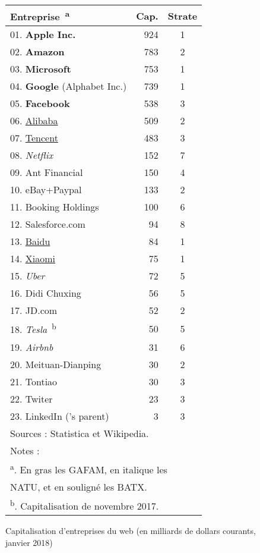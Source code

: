 \begin{figure}[t]
 \centering
 {\caption{Capitalisation d'entreprises du web (en milliards de dollars
 courants, janvier 2018)}\vspace{12pt}}
 \begin{tabular}[c]{l|rc}
  \hline\hline
  Entreprise\ \textsuperscript{a}			& Cap.		& Strate\\
  \hline
  01. \textbf{Apple Inc.}      				& 924		&	1	\\
  02. \textbf{Amazon}						& 783		&	2	\\
  03. \textbf{Microsoft}					& 753		&	1	\\
  04. \textbf{Google} (Alphabet Inc.)		& 739		&	1	\\
  \hline
  05. \textbf{Facebook}						& 538		&	3	\\
  06. \underline{Alibaba}					& 509		&	2	\\
  07. \underline{Tencent}					& 483		&	3	\\
  08. \textit{Netflix}						& 152		&	7	\\
  09. Ant Financial							& 150		&	4	\\
  10. eBay+Paypal							& 133		&	2	\\
  11. Booking Holdings						& 100		&	6	\\
  12. Salesforce.com						&  94		&	8	\\
  13. \underline{Baidu}						&  84		&	1	\\
  14. \underline{Xiaomi}					&  75		&	1	\\
  15. \textit{Uber}							&  72		&	5	\\
  16. Didi Chuxing							&  56		&	5	\\
  17. JD.com								&  52		&	2	\\
  18. \textit{Tesla}\ \textsuperscript{b}	&  50		& 	5	\\
  19. \textit{Airbnb}						&  31		&	6	\\
  20. Meituan-Dianping						&  30		&	2	\\
  21. Tontiao								&  30		&	3	\\
  22. Twiter								&  23		& 	3	\\
  23. LinkedIn ('s parent)					&   3		&	3	\\	
  \hline\hline
  \multicolumn{3}{l}{Sources : Statistica et Wikipedia.} \\
  \multicolumn{3}{l}{Notes : } \\
  \multicolumn{3}{l}{\hspace{1cm}\textsuperscript{a}. En gras les GAFAM, en
  italique les} \\
  \multicolumn{3}{l}{\hspace{1.5cm}	NATU, et en soulign\'e les BATX.} \\
  \multicolumn{3}{l}{\hspace{1cm}\textsuperscript{b}. Capitalisation de
  novembre 2017.} \\	
 \end{tabular}
 \normalsize
\end{figure}
